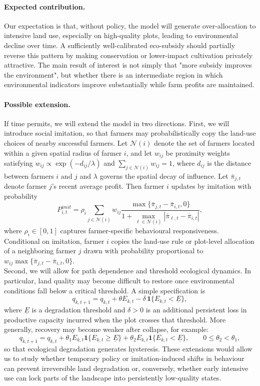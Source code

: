 \documentclass{article}
\begin{document}
\paragraph{Expected contribution.}
Our expectation is that, without policy, the model will generate over-allocation to intensive land use, especially on high-quality plots, leading to environmental decline over time. A sufficiently well-calibrated eco-subsidy should partially reverse this pattern by making conservation or lower-impact cultivation privately attractive. The main result of interest is not simply that "more subsidy improves the environment", but whether there is an intermediate region in which environmental indicators improve substantially while farm profits are maintained.

\paragraph{Possible extension.}
If time permits, we will extend the model in two directions. First, we will introduce {social imitation}, so that farmers may probabilistically copy the land-use choices of nearby successful farmers. Let $\mathcal{N}(i)$ denote the set of farmers located within a given spatial radius of farmer $i$, and let $w_{ij}$ be proximity weights satisfying $w_{ij} \propto \exp(-d_{ij}/\lambda)$ and $\sum_{j \in \mathcal{N}(i)} w_{ij}=1$, where $d_{ij}$ is the distance between farmers $i$ and $j$ and $\lambda$ governs the spatial decay of influence. Let $\bar{\pi}_{j,t}$ denote farmer $j$'s recent average profit. Then farmer $i$ updates by imitation with probability
\[
P^{imit}_{i,t} = \rho_i \sum_{j \in \mathcal{N}(i)} w_{ij} \frac{\max\{\bar{\pi}_{j,t}-\bar{\pi}_{i,t},0\}}{1+\max_{\ell \in \mathcal{N}(i)} |\bar{\pi}_{\ell,t}-\bar{\pi}_{i,t}|},
\]
where $\rho_i \in [0,1]$ captures farmer-specific behavioural responsiveness. Conditional on imitation, farmer $i$ copies the land-use rule or plot-level allocation of a neighboring farmer $j$ drawn with probability proportional to $w_{ij}\max\{\bar{\pi}_{j,t}-\bar{\pi}_{i,t},0\}$. \\

Second, we will allow for {path dependence and threshold ecological dynamics}. In particular, land quality may become difficult to restore once environmental conditions fall below a critical threshold. A simple specification is
\[
q_{k,t+1} = q_{k,t} + \theta E_{k,t} - \delta \, \mathbf{1}\{E_{k,t}<\underline{E}\},
\]
where $\underline{E}$ is a degradation threshold and $\delta>0$ is an additional persistent loss in productive capacity incurred when the plot crosses that threshold. More generally, recovery may become weaker after collapse, for example:
\[
q_{k,t+1} = q_{k,t} + \theta_1 E_{k,t}\mathbf{1}\{E_{k,t}\geq \underline{E}\} + \theta_2 E_{k,t}\mathbf{1}\{E_{k,t}<\underline{E}\}, \qquad 0 \leq \theta_2 < \theta_1,
\]
so that ecological degradation generates hysteresis. These extensions would allow us to study whether temporary policy or imitation-induced shifts in behaviour can prevent irreversible land degradation or, conversely, whether early intensive use can lock parts of the landscape into persistently low-quality states.



\end{document}
